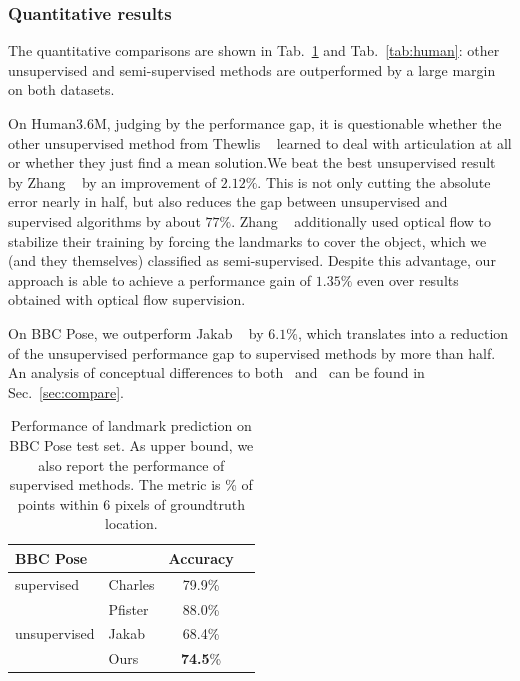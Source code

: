 		\subsubsection{Quantitative results}

			The quantitative comparisons are shown in Tab.~\ref{tab:bbcpose} and Tab.~\ref{tab:human}: other unsupervised and semi-supervised methods are outperformed by a large margin on both datasets.

			On Human3.6M, judging by the performance gap, it is questionable whether the other unsupervised method from Thewlis \etal~\cite{thewlis17} learned to deal with articulation at all or whether they just find a mean solution.We beat the best unsupervised result by Zhang \etal~\cite{zhang18} by an improvement of $2.12\%$. This is not only cutting the absolute error nearly in half, but also reduces the gap between unsupervised and supervised algorithms by about $77\%$.
			Zhang \etal~\cite{zhang18} additionally used optical flow to stabilize their training by forcing the landmarks to cover the object, which we (and they themselves) classified as semi-supervised.
			Despite this advantage, our approach is able to achieve a performance gain of $1.35\%$ even over results obtained with optical flow supervision.  %

			On BBC Pose, we outperform Jakab \etal~\cite{jakab18} by $6.1\%$, which translates into a reduction of the unsupervised performance gap to supervised methods by more than half. An analysis of conceptual differences to both~\cite{zhang18} and~\cite{jakab18} can be found in Sec.~\ref{sec:compare}.

			\begin{table}[htp]
				\caption{{
				Performance of landmark prediction on BBC Pose test set. As upper bound, we also report the performance of supervised methods.
				The metric is \% of points within 6 pixels of groundtruth location. %
				}}
				\label{tab:bbcpose}
				\centering
				\begin{tabular}{ll|cr}
				\hline
				BBC Pose &   &    { Accuracy}  \\
				 \hline
				supervised & Charles \etal \cite{charles13bbcpose} &
				   79.9\%  \\ %
				 & Pfister \etal \cite{pfister15flowingconv}  &
				  88.0\%  \\ \hline %
				unsupervised &Jakab \etal \cite{jakab18} &
				 68.4\%  \\  %
				  &Ours &  \textbf{74.5}\% \\
				\hline
				\end{tabular}
			\end{table}

